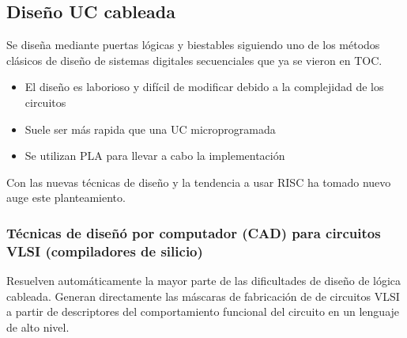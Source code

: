 \subsection{Diseño UC cableada}
Se diseña mediante puertas lógicas y biestables siguiendo uno de los métodos clásicos de diseño de sistemas digitales secuenciales que ya se vieron en TOC.
\begin{itemize}
    \item El diseño es laborioso y difícil de modificar debido a la complejidad de los circuitos
    \item Suele ser más rapida que una UC microprogramada
    \item Se utilizan PLA para llevar a cabo la implementación
\end{itemize}
Con las nuevas técnicas de diseño y la tendencia a usar RISC ha tomado nuevo auge este planteamiento.
\subsubsection*{Técnicas de diseñó por computador (CAD) para circuitos VLSI (compiladores de silicio)}
Resuelven automáticamente la mayor parte de las dificultades de diseño de lógica cableada. Generan
directamente las máscaras de fabricación de de circuitos VLSI a partir de descriptores del comportamiento funcional
del circuito en un lenguaje de alto nivel.

